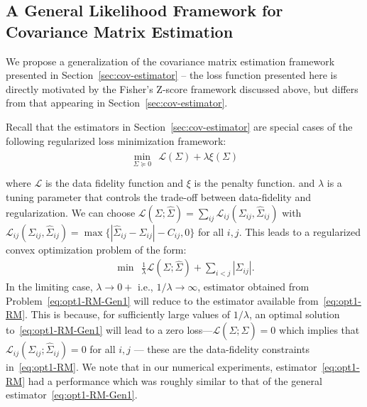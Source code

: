\subsection*{A General Likelihood Framework for \Robocov{} Covariance Matrix Estimation}

We propose a generalization of the \Robocov{} covariance matrix estimation framework presented in Section~\ref{sec:cov-estimator} -- the loss function presented here is directly motivated by the Fisher's Z-score framework discussed above, but differs from that appearing in Section~\ref{sec:cov-estimator}.  

Recall that the estimators in Section~\ref{sec:cov-estimator} are special cases of the following regularized loss minimization framework:
\begin{align}\label{eq:opt1-general-RM}
 \begin{aligned}
    \min_{\Sigma \succeq 0} ~~ \mathcal{L} (\Sigma) + \lambda \xi(\Sigma) \\
\end{aligned}
\end{align}
where $\mathcal{L}$ is the data fidelity function and $\xi$ is the penalty function. 
and $\lambda$ is a tuning parameter that controls the trade-off between data-fidelity and regularization. We can choose ${\mathcal L}(\Sigma; \hat{\Sigma}) = \sum_{ij} {\mathcal L}_{ij}(\Sigma_{ij}, \hat{\Sigma}_{ij})$ with 
${\mathcal L}_{ij}(\Sigma_{ij}, \hat{\Sigma}_{ij})= \max \{| \hat{\Sigma}_{ij} - \Sigma_{ij} |  -  C_{ij}, 0\}$ for all $i,j$.
This leads to a regularized convex optimization problem of the form:
\begin{equation}\label{eq:opt1-RM-Gen1}
    \begin{aligned}\min~~ \frac{1}{\lambda}{\mathcal L}(\Sigma; \hat{\Sigma}) +  \sum_{i<j} |\Sigma_{ij}|.
    \end{aligned}
\end{equation}
In the limiting case, $\lambda\rightarrow 0+$ i.e., $1/\lambda \rightarrow \infty$, estimator obtained from Problem~\eqref{eq:opt1-RM-Gen1} will reduce to the estimator available from~\eqref{eq:opt1-RM}. This is because, for sufficiently large values of $1/\lambda$, 
an optimal solution to~\eqref{eq:opt1-RM-Gen1} will lead to a zero loss---${\mathcal L}(\Sigma; \hat{\Sigma}) = 0$ which implies that 
${\mathcal L}_{ij}(\Sigma_{ij}; \hat{\Sigma}_{ij}) = 0$ for all $i,j$ --- these are the data-fidelity constraints in~\eqref{eq:opt1-RM}.
We note that in our numerical experiments, estimator~\eqref{eq:opt1-RM} had a performance which was roughly similar to that of the general estimator~\eqref{eq:opt1-RM-Gen1}.


